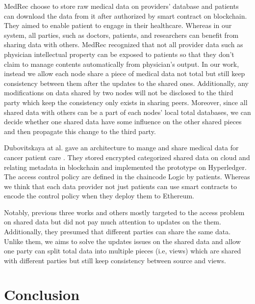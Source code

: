 \documentclass[conference]{IEEEtran}
\begin{document}
MedRec \cite{azaria2016medrec} choose to store raw medical data on providers' database and patients can download the data from it after authorized by smart contract on blockchain. They aimed to enable patient to engage in their healthcare. Whereas in our system, all parties, such as doctors, patients, and researchers can benefit from sharing data with others. MedRec recognized that not all provider data such as physician intellectual property can be exposed to patients \cite{us2017individuals, grossman2011clinical} so that they don't claim to manage contents automatically from physician's output. In our work, instead we allow each node share a piece of medical data not total but still keep consistency between them after the updates to the shared ones. Additionally, any modifications on data shared by two nodes will not be disclosed to the third party which keep the consistency only exists in sharing peers. Moreover, since all shared data with others can be a part of each nodes' local total databases, we can decide whether one shared data have some influence on the other shared pieces and then propagate this change to the third party.

Dubovitskaya at al. gave an architecture to mange and share medical data for cancer patient care \cite{dubovitskaya2017secure}. They stored encrypted categorized shared data on cloud and relating metadata in blockchain and implemented the prototype on Hyperledger\cite{hyperledger2017hyperledger}. The access control policy are defined in the chaincode Logic by patients. Whereas we think that each data provider not just patients can use smart contracts to encode the control policy when they deploy them to Ethereum. 

Notably, previous three works and others \cite{liu2018bpds,xia2017bbds,amofa2018blockchain,dagher2018ancile,fan2018medblock} mostly targeted to the access problem on shared data but did not pay much attention to updates on the them. Additionally, they presumed that different parties can share the same data. Unlike them, we aims to solve the updates issues on the shared data and allow one party can split total data into multiple pieces (i.e, views) which are shared with different parties but still keep consistency between source and views.

\section{Conclusion}
\label{conclude}
\end{document}
